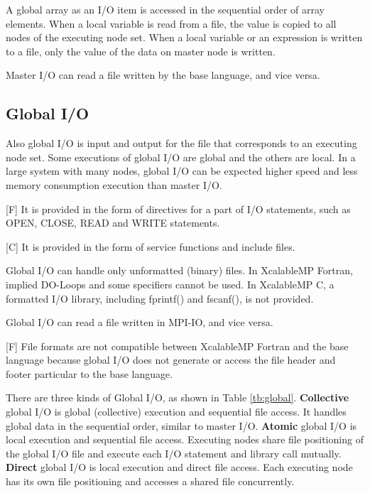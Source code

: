   A global array as an I/O item is accessed in the sequential order of
  array elements.
  When a local variable is read from a file, the value is copied to all
  nodes of the executing node set.
  When a local variable or an expression is written to a file, only the
  value of the data on master node is written.
  
  Master I/O can read a file written by the base language, and vice
  versa.
  

  \subsection{Global I/O}

  Also global I/O is input and output for the file that corresponds to
  an executing node set.
  Some executions of global I/O are global and the others are local.
  In a large system with many nodes, global I/O can be expected higher
  speed and less memory consumption execution than master I/O.

  [F] It is provided in the form of directives for a part of I/O
  statements, such as OPEN, CLOSE, READ
  and WRITE statements.

  [C] It is provided in the form of service functions and include files.

  Global I/O can handle only unformatted (binary) files. In XcalableMP Fortran,
  implied DO-Loops and some specifiers cannot be used.
  In XcalableMP C, a formatted I/O library, including fprintf() and fscanf(), is not provided.

  Global I/O can read a file written in MPI-IO, and vice versa. 

  [F] File formats are not compatible between XcalableMP Fortran
  and the base language because global I/O does not generate or access
  the file header and footer particular to the base language.

  There are three kinds of Global I/O, as shown in Table
  \ref{tb:global}.
  {\bf Collective} global I/O is global (collective) execution and
  sequential file access.
  It handles global data in the sequential order, similar to master
  I/O.
  {\bf Atomic} global I/O is local execution and sequential file access.
  Executing nodes share file positioning of the global I/O file and
  execute each I/O statement and library call mutually.
  {\bf Direct} global I/O is local execution and direct file access.
  Each executing node has its own file positioning and accesses a shared
  file concurrently.

